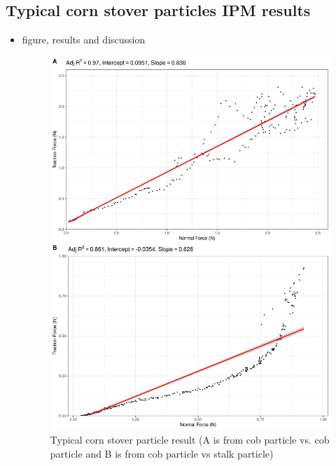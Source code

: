 \documentclass[xcolor=dvipsnames,10pt,hidelinks]{article}
\let\oldsubsection\subsection
\renewcommand{\subsection}{\clearpage\oldsubsection}
\begin{document}
\subsection{Typical corn stover particles IPM results}
\label{sec:org9f7a788}
\begin{itemize}
\item figure, results and discussion
\label{sec:org35ab072}

\begin{figure}[!htb]
\centering
\includegraphics[width=.9\linewidth]{./figures/typical_result_cs_two_cases.png}
\caption{\label{fig:org3d0df44}Typical corn stover particle result (A is from cob particle vs. cob particle and B is from cob particle vs stalk particle)}
\end{figure}


\end{itemize}
\end{document}
